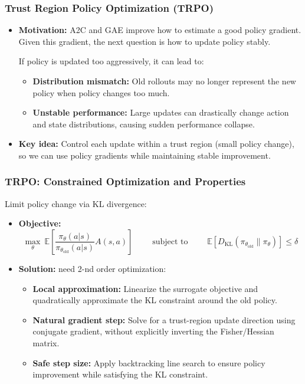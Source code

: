 \documentclass[11pt,aspectratio=169,xcolor={dvipsnames},usepdftitle=false]{beamer}
\begin{document}
\begin{frame}
\frametitle{Trust Region Policy Optimization (TRPO)}
\begin{itemize}

	\item \textbf{Motivation:}
	A2C and GAE improve how to estimate a good policy gradient.
	Given this gradient, the next question is how to update policy stably.
	
    If policy is updated too aggressively, it can lead to:
	\begin{itemize}
		\item \textbf{Distribution mismatch:}
		Old rollouts may no longer represent the new policy when policy changes too much.
		\item \textbf{Unstable performance:}
		Large updates can drastically change action and state distributions, causing sudden performance collapse.
	\end{itemize}

	\item \textbf{Key idea:}
	Control each update within a trust region (small policy change),
	so we can use policy gradients while maintaining stable improvement.

\end{itemize}
\end{frame}


\begin{frame}
\frametitle{TRPO: Constrained Optimization and Properties}
Limit policy change via KL divergence:
\begin{itemize}

	\item \textbf{Objective:}
	$$
	\max_\theta \ \mathbb{E}\left[
	\frac{\pi_\theta(a|s)}{\pi_{\theta_{\text{old}}}(a|s)} A(s,a)
	\right] \qquad \text{ subject to } \qquad
	\mathbb{E}\left[
	D_{\text{KL}}(\pi_{\theta_{\text{old}}} \| \pi_\theta)
	\right] \leq \delta
	$$

	\item \textbf{Solution:} need 2-nd order optimization:
	\begin{itemize}
        \item \textbf{Local approximation:}
        Linearize the surrogate objective and quadratically approximate the KL constraint around the old policy.

        \item \textbf{Natural gradient step:}
        Solve for a trust-region update direction using conjugate gradient, without explicitly inverting the Fisher/Hessian matrix.

        \item \textbf{Safe step size:}
        Apply backtracking line search to ensure policy improvement while satisfying the KL constraint.
    \end{itemize}
\end{itemize}
\end{frame}
\end{document}
